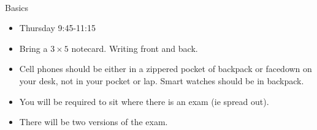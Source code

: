 \documentclass[11pt,fleqn]{article}
\begin{document}
\renewcommand{\headrulewidth}{0pt}
\newcommand{\blank}[1]{\rule{#1}{0.75pt}}
\newcommand{\bc}{\begin{center}}
\newcommand{\ec}{\end{center}}
\renewcommand{\d}{\displaystyle}

\vspace*{-0.7in}

\begin{center}
  \large
  \\
   
\end{center}
{\Large{Basics}}\\

\begin{itemize}
\item Thursday 9:45-11:15
\item Bring a $ 3 \times 5 $ notecard. Writing front and back.
\item Cell phones should be either in a zippered pocket of backpack or facedown on your desk, not in your pocket or lap. Smart watches should be in backpack.
\item You will be required to sit where there is an exam (ie spread out).
\item There will be two versions of the exam.\\
\end{itemize}

\\
\end{document}
